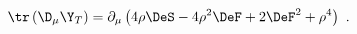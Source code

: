 \begin{equation}
  \label{eq:trDY2}
  \tr\left(\D_\mu\Y_T\right)=\partial_\mu\left(4\rho\DeS-4\rho^2\DeF+2\DeF^2+\rho^4\right)\
  .
\end{equation}

